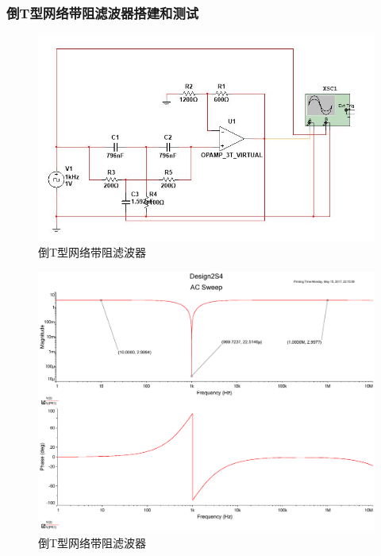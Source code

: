 \documentclass[UTF8,a4paper]{paper}
\begin{document}
\subsubsection{倒T型网络带阻滤波器搭建和测试}
\begin{figure}
\centering
\includegraphics[width=\textwidth]{S.jpg}
\caption{倒T型网络带阻滤波器}
\label{P}
\end{figure}
\begin{figure}
\centering
\includegraphics[width=\textwidth]{2Sinf.pdf}
\caption{倒T型网络带阻滤波器}
\label{SQ}
\end{figure}
\end{document}

